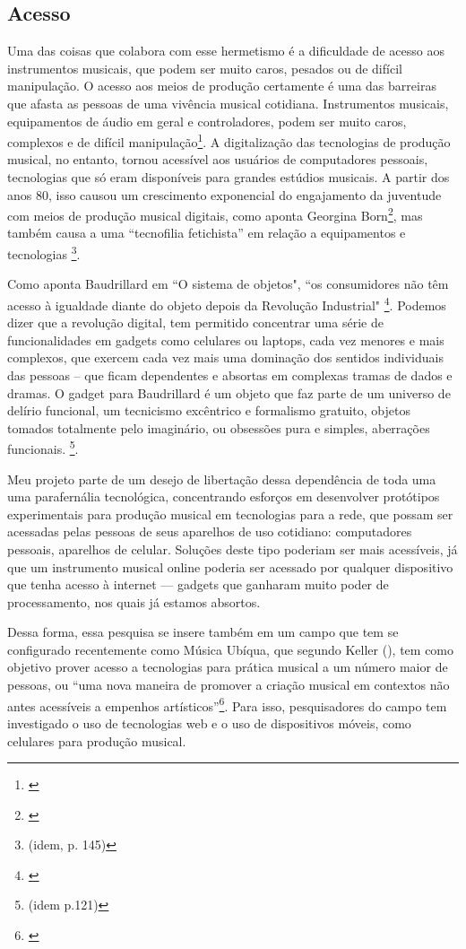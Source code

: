 \subsection{Acesso}
Uma das coisas que colabora com esse hermetismo é a dificuldade de acesso aos instrumentos musicais, que podem ser muito caros, pesados ou de difícil manipulação. O acesso aos meios de produção certamente é uma das barreiras que afasta as pessoas de uma vivência musical cotidiana. Instrumentos musicais, equipamentos de áudio em geral e controladores, podem ser muito caros, complexos e de difícil manipulação\footnote{\cite{Fiebrink2007}}. A digitalização das tecnologias de produção musical, no entanto, tornou acessível aos usuários de computadores pessoais, tecnologias que só eram disponíveis para grandes estúdios musicais. A partir dos anos 80, isso causou um crescimento exponencial do engajamento da juventude com meios de produção musical digitais, como aponta Georgina Born\footnote{\cite[p. 143]{Born2015}}, mas também causa a uma ``tecnofilia fetichista'' em relação a equipamentos e tecnologias \footnote{(idem, p. 145)}.

Como aponta Baudrillard em ``O sistema de objetos", ``os consumidores não têm acesso à igualdade diante do objeto depois da Revolução Industrial" \footnote{\cite[p. 162]{Baudrillard2012}}. Podemos dizer que a revolução digital, tem permitido concentrar uma série de funcionalidades em gadgets como celulares ou laptops, cada vez menores e mais complexos, que exercem cada vez mais uma dominação dos sentidos individuais das pessoas – que ficam dependentes e absortas em complexas tramas de dados e dramas. O gadget para Baudrillard é um objeto que faz parte de um universo de delírio funcional, um tecnicismo excêntrico e formalismo gratuito, objetos tomados totalmente pelo imaginário, ou obsessões pura e simples, aberrações funcionais. \footnote{(idem p.121)}. 

Meu projeto parte de um desejo de libertação dessa dependência de toda uma uma parafernália tecnológica, concentrando esforços em desenvolver protótipos experimentais para produção musical em tecnologias para a rede, que possam ser acessadas pelas pessoas de seus aparelhos de uso cotidiano: computadores pessoais, aparelhos de celular. Soluções deste tipo poderiam ser mais acessíveis, já que um instrumento musical online poderia ser acessado por qualquer dispositivo que tenha acesso à internet --- gadgets que ganharam muito poder de processamento, nos quais já estamos absortos. 

Dessa forma, essa pesquisa se insere também em um campo que tem se configurado recentemente como Música Ubíqua, que segundo Keller (\citeyear{Keller2018}), tem como objetivo prover acesso a tecnologias para prática musical a um número maior de pessoas, ou ``uma nova maneira de promover a criação musical em contextos não antes acessíveis a empenhos artísticos''\footnote{\cite{Keller2018}}. Para isso, pesquisadores do campo tem investigado o uso de tecnologias web e o uso de dispositivos móveis, como celulares para produção musical. 

